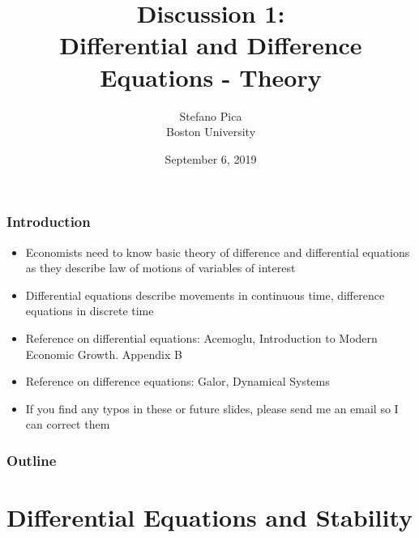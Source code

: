 \documentclass[11pt]{beamer}
\begin{document}
\title{Discussion 1: \\ Differential and Difference Equations - Theory}
\author{Stefano Pica \\ Boston University}
\date{September 6, 2019}


\begin{frame}
	\titlepage
\end{frame}


\begin{frame}
\frametitle{Introduction}
\begin{itemize}\itemsep2ex
	\item Economists need to know basic theory of difference and differential equations as they describe law of motions of variables of interest
	\item Differential equations describe movements in continuous time, difference equations in discrete time
	\item Reference on differential equations: Acemoglu, Introduction to Modern Economic Growth. Appendix B
	\item Reference on difference equations: Galor, Dynamical Systems
	\item If you find any typos in these or future slides, please send me an email so I can correct them
\end{itemize}
\end{frame}


\begin{frame}
	\frametitle{Outline}
	\tableofcontents
\end{frame}


\section{Differential Equations and Stability}

\end{document}
